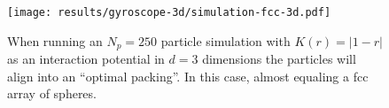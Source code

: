 \begin{figure}[H]
  \centering
  \texttt{[image: results/gyroscope-3d/simulation-fcc-3d.pdf]}
  \caption{When running an $N_p = 250$ particle simulation with $K(r) = |1-r|$ as an interaction potential in $d=3$ dimensions the particles will align into an ``optimal packing''. In this case, almost equaling a \gls{fcc} array of spheres.}
  \label{fig:fcc-quiver-3d}
\end{figure}

